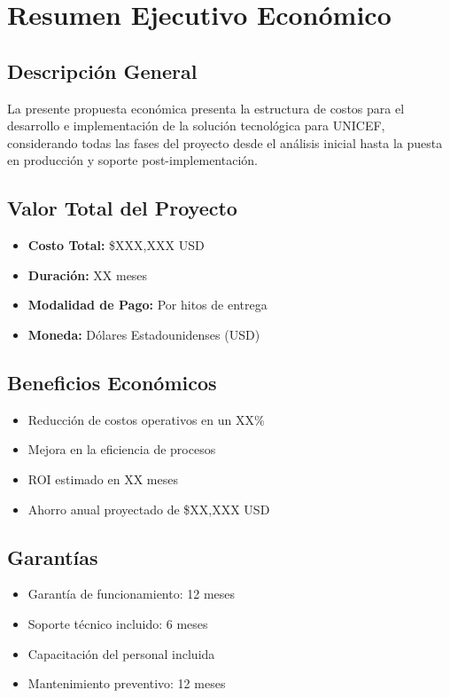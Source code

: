 \section{Resumen Ejecutivo Económico}

\subsection{Descripción General}
La presente propuesta económica presenta la estructura de costos para el desarrollo e implementación de la solución tecnológica para UNICEF, considerando todas las fases del proyecto desde el análisis inicial hasta la puesta en producción y soporte post-implementación.

\subsection{Valor Total del Proyecto}
\begin{itemize}
    \item \textbf{Costo Total:} \$XXX,XXX USD
    \item \textbf{Duración:} XX meses
    \item \textbf{Modalidad de Pago:} Por hitos de entrega
    \item \textbf{Moneda:} Dólares Estadounidenses (USD)
\end{itemize}

\subsection{Beneficios Económicos}
\begin{itemize}
    \item Reducción de costos operativos en un XX\%
    \item Mejora en la eficiencia de procesos
    \item ROI estimado en XX meses
    \item Ahorro anual proyectado de \$XX,XXX USD
\end{itemize}

\subsection{Garantías}
\begin{itemize}
    \item Garantía de funcionamiento: 12 meses
    \item Soporte técnico incluido: 6 meses
    \item Capacitación del personal incluida
    \item Mantenimiento preventivo: 12 meses
\end{itemize}